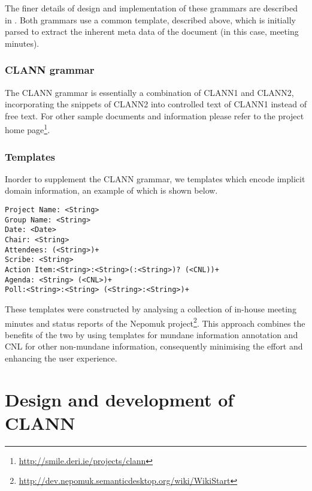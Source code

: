 The finer details of design and implementation of these grammars are described in \cite{cnl09}.  Both grammars use a common template, described above, which is initially parsed to extract  the inherent meta data of the document (in this case, meeting minutes). 

\subsubsection{CLANN grammar}

 
The CLANN grammar is essentially a combination of CLANN1 and CLANN2, incorporating the snippets of CLANN2 into controlled text of CLANN1 instead of free text.   For other sample documents and information please refer to the project home page\footnote{\url{http://smile.deri.ie/projects/clann}}.


\subsubsection{Templates}
Inorder to supplement the CLANN grammar, we templates which encode implicit domain information, an example of which is shown below.

\begin{minipage}[t]{3.5in}

\texttt{Project Name: <String>\\
Group Name: <String>\\
Date: <Date>\\
Chair: <String>\\
Attendees: (<String>)+\\
Scribe: <String>\\
Action Item:<String>:<String>(:<String>)? (<CNL))+\\
Agenda: <String> (<CNL>)+\\
Poll:<String>:<String> (<String>:<String>)+\\
}
\end{minipage}

These templates were constructed by analysing a collection of in-house meeting minutes and status reports  of the Nepomuk project\footnote{\url{http://dev.nepomuk.semanticdesktop.org/wiki/WikiStart}}.  This approach combines the benefits of the two by using templates for mundane information annotation and CNL for other non-mundane information, consequently minimising the effort and enhancing the user experience.


\section{Design and development of CLANN}
